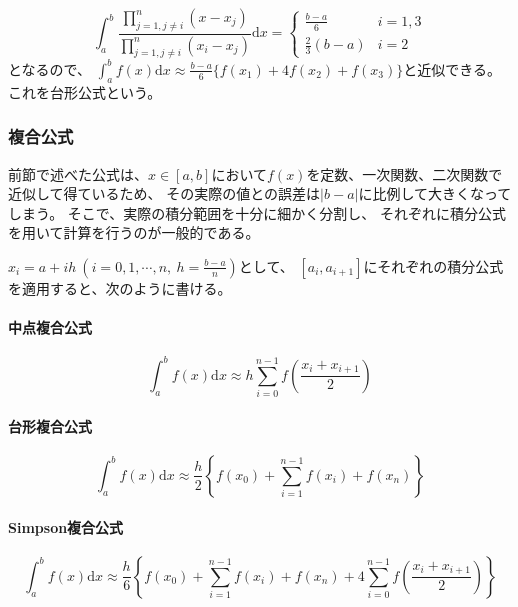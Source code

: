 \documentclass[a4j, titlepage]{jsarticle}
\numberwithin{equation}{section}
\begin{document}
                \begin{equation*}
                    \int_a^b\frac{\displaystyle\prod_{j=1,j\neq i}^n (x-x_j)}{\displaystyle\prod_{j=1,j\neq i}^n (x_i-x_j)}\mathrm{d}x=\begin{cases}
                        \displaystyle\frac{b-a}{6} & i=1,3 \\
                        \displaystyle\frac{2}{3}(b-a) & i=2
                    \end{cases}
                \end{equation*}
                となるので、
                $\displaystyle\int_a^bf(x)\mathrm{d}x\approx\frac{b-a}{6}\{f(x_1)+4f(x_2)+f(x_3)\}$と近似できる。
                これを台形公式という。

        \subsubsection{複合公式}
            前節で述べた公式は、$x\in[a,b]$において$f(x)$を定数、一次関数、二次関数で近似して得ているため、
            その実際の値との誤差は$|b-a|$に比例して大きくなってしまう。
            そこで、実際の積分範囲を十分に細かく分割し、
            それぞれに積分公式を用いて計算を行うのが一般的である。
            
            $x_i=a+ih \ \left(i=0,1,\cdots,n, \ \displaystyle h=\frac{b-a}{n}\right)$として、
            $[a_i,a_{i+1}]$にそれぞれの積分公式を適用すると、次のように書ける。

            \paragraph{中点複合公式}
                \begin{equation}
                    \int_a^bf(x)\mathrm{d}x\approx h\sum_{i=0}^{n-1}f\left(\frac{x_i+x_{i+1}}{2}\right)
                \end{equation}

            \paragraph{台形複合公式}
                \begin{equation}
                    \int_a^bf(x)\mathrm{d}x\approx\frac{h}{2}\left\{f(x_0) + \sum_{i=1}^{n-1}f(x_i) + f(x_n)\right\}
                \end{equation}

            \paragraph{Simpson複合公式}
                \begin{equation}
                    \int_a^bf(x)\mathrm{d}x\approx\frac{h}{6}\left\{f(x_0) + \sum_{i=1}^{n-1}f(x_i) + f(x_n) + 4\sum_{i=0}^{n-1}f\left(\frac{x_i+x_{i+1}}{2}\right)\right\}
                \end{equation}
\end{document}
